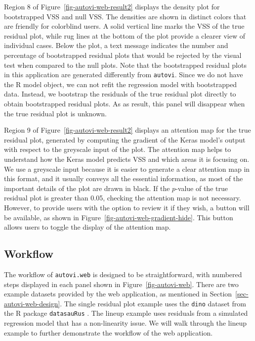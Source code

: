 \documentclass[
doublespace,
  times]{anzsauth}
\begin{document}
Region 8 of Figure~\ref{fig-autovi-web-result2} displays the density
plot for bootstrapped VSS and null VSS. The densities are shown in
distinct colors that are friendly for colorblind users. A solid vertical
line marks the VSS of the true residual plot, while rug lines at the
bottom of the plot provide a clearer view of individual cases. Below the
plot, a text message indicates the number and percentage of bootstrapped
residual plots that would be rejected by the visual test when compared
to the null plots. Note that the bootstrapped residual plots in this
application are generated differently from \texttt{autovi}. Since we do
not have the R model object, we can not refit the regression model with
bootstrapped data. Instead, we bootstrap the residuals of the true
residual plot directly to obtain bootstrapped residual plots. As as
result, this panel will disappear when the true residual plot is
unknown.

Region 9 of Figure~\ref{fig-autovi-web-result2} displays an attention
map for the true residual plot, generated by computing the gradient of
the Keras model's output with respect to the greyscale input of the
plot. The attention map helps to understand how the Keras model predicts
VSS and which areas it is focusing on. We use a greyscale input because
it is easier to generate a clear attention map in this format, and it
usually conveys all the essential information, as most of the important
details of the plot are drawn in black. If the \(p\)-value of the true
residual plot is greater than 0.05, checking the attention map is not
necessary. However, to provide users with the option to review it if
they wish, a button will be available, as shown in
Figure~\ref{fig-autovi-web-gradient-hide}. This button allows users to
toggle the display of the attention map.

\subsection{Workflow}\label{sec-autovi-web-workflow}

The workflow of \texttt{autovi.web} is designed to be straightforward,
with numbered steps displayed in each panel shown in
Figure~\ref{fig-autovi-web}. There are two example datasets provided by
the web application, as mentioned in
Section~\ref{sec-autovi-web-design}. The single residual plot example
uses the \texttt{dino} dataset from the R package \texttt{datasauRus}
\citep{datasaurus}. The lineup example uses residuals from a simulated
regression model that has a non-linearity issue. We will walk through
the lineup example to further demonstrate the workflow of the web
application.
\end{document}
